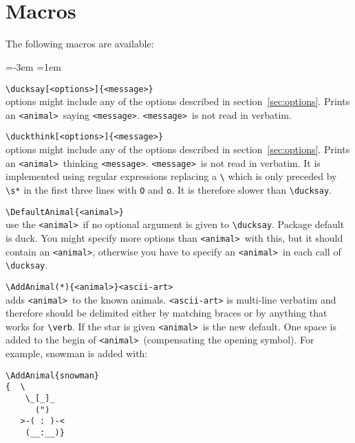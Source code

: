 \documentclass[]{article}
\newcommand*{\anml}{\texttt{<animal>}}
\newcommand*{\msg}{\texttt{<message>}}
\newenvironment{codedescription}{%
  \parindent=-3em%
  \parskip=1em%
  \par%
}{}
\begin{document}
\begin{titlepage}%
  \makeatletter
  \centering
  \Large
    \\
  \vfill
  \normalsize
  \hspace*{-2cm}
    \ducksay[cow,bubble=\large]{\ducksay@version}\\
  \small
  \vspace*{-5cm}\hspace*{5cm}
  \mbox{}\hfil
  \vspace{2cm}
  \vfill
  \vfill
  \hspace*{-0cm}
  \large
  \small
  \makeatother
\end{titlepage}%
\section{Macros}
The following macros are available:

\begin{codedescription}
\verb|\ducksay[<options>]{<message>}|\\
  options might include any of the options described in
  section~\ref{sec:options}. Prints an \anml\ saying \msg. \msg\ is not read in
  verbatim.

\verb|\duckthink[<options>]{<message>}|\\
  options might include any of the options described in
  section~\ref{sec:options}. Prints an \anml\ thinking \msg. \msg\ is not read
  in verbatim. It is implemented using regular expressions replacing a \verb|\|
  which is only preceded by \verb|\s*| in the first three lines with \verb|O|
  and \verb|o|. It is therefore slower than \verb|\ducksay|.

\verb|\DefaultAnimal{<animal>}|\\
  use the \anml\ if no optional argument is given to \verb|\ducksay|. Package
  default is duck. You might specify more options than \anml\ with this, but it
  should contain an \anml, otherwise you have to specify an \anml\ in each call
  of \verb|\ducksay|.

\verb|\AddAnimal(*){<animal>}<ascii-art>|\\
  adds \anml\ to the known animals. \texttt{<ascii-art>} is multi-line verbatim
  and therefore should be delimited either by matching braces or by anything
  that works for \verb|\verb|. If the star is given \anml\ is the new default.
  One space is added to the begin of \anml\ (compensating the opening symbol).
  For example, snowman is added with:
  \vspace{-2ex}
\begin{verbatim}
\AddAnimal{snowman}
{  \
    \_[_]_
      (")
   >-( : )-<
    (__:__)}
\end{verbatim}
\end{codedescription}
\end{document}

